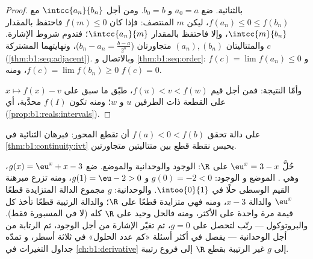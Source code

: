 \begin{proof}
بالثنائية. ضع $a_0 = a$ و $b_0 = b$. ومن أجل $\intcc{a_n}{b_n}$ مع
$f(a_n) \leq 0 \leq f(b_n)$، ليكن $m$ المنتصف: فإذا كان $f(m) \leq
0$ فاحتفظ بالمقدار $\intcc{m}{b_n}$، وإلا فاحتفظ بالمقدار $\intcc{a_n}{m}$؛ فتدوم
شروط الإشارة. والمتتاليتان $(a_n), (b_n)$ متجاورتان ($b_n -
a_n = \frac{b-a}{2^n}$)، ونهايتهما المشتركة $c$
(\cref{thm:b1:seq:adjacent}). وبالاتصال و
\cref{thm:b1:seq:order}: $f(c) = \lim f(a_n) \leq 0$ و $f(c) =
\lim f(b_n) \geq 0$، ومنه $f(c) = 0$.

وأمّا النتيجة: فمن أجل قيم $f(u) < v < f(w)$، طبّق ما سبق
على $x \mapsto f(x) - v$ على القطعة ذات الطرفين $u$ و $w$؛
ومنه تكون $f(I)$ محدَّبة، أي 
(\cref{prop:b1:reals:intervals}).
\end{proof}

\begin{omfigure}

{\small على دالة  تحقق $f(a) < 0 < f(b)$ أن تقطع
المحور: فبرهان الثنائية في \cref{thm:b1:continuity:ivt} يحبس نقطة
قطع بين متتاليتين متجاورتين.}
\end{omfigure}

\begin{example}\label{ex:b1:continuity:protocol}
حُلَّ $\eu^x = 3 - x$ على $\R$: الوجود والوحدانية
والموضع. ضع $g(x) = \eu^x + x - 3$، وهي . الموضع و
الوجود: $g(0) = -2 < 0$ و $g(1) = \eu - 2 > 0$، ومنه
تزرع مبرهنة القيم الوسطى حلًا في
$\intoo{0}{1}$. والوحدانية: $g$ مجموع الدالة المتزايدة قطعًا
$\eu^x$ والدالة $x - 3$، ومنه فهي متزايدة قطعًا على
$\R$؛ والدالة الرتيبة قطعًا تأخذ كل قيمة مرة واحدة
على الأكثر، ومنه فالحل وحيد على $\R$ كله (لا في
 المسبورة فقط). والبروتوكول --- رتّب لتحصل على $g = 0$، ثم
تغيّر الإشارة من أجل الوجود، ثم الرتابة من أجل الوحدانية --- يفصل في
أكثر أسئلة «كم عدد الحلول» في ثلاثة أسطر، و
تمدّه جداول التغيرات في \cref{ch:b1:derivative}
إلى $g$ غير الرتيبة بقطع $\R$ إلى فروع
رتيبة.
\end{example}

